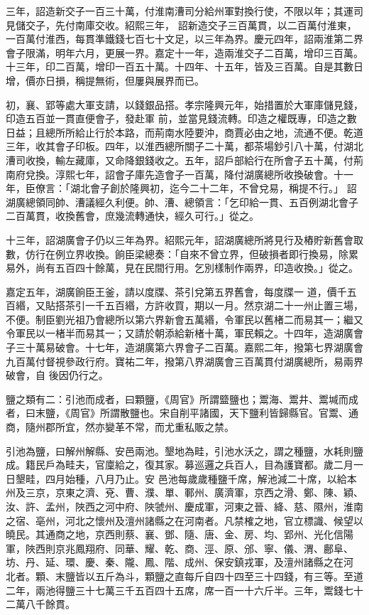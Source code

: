 \begin{pinyinscope}
 三年，詔造新交子一百三十萬，付淮南漕司分給州軍對換行使，不限以年；其運司見儲交子，先付南庫交收。紹熙三年，
 詔新造交子三百萬貫，以二百萬付淮東，一百萬付淮西，每貫準鐵錢七百七十文足，以三年為界。慶元四年，詔兩淮第二界會子限滿，明年六月，更展一界。嘉定十一年，造兩淮交子二百萬，增印三百萬。十三年，印二百萬，增印一百五十萬。十四年、十五年，皆及三百萬。自是其數日增，價亦日損，稱提無術，但屢與展界而已。



 初，襄、郢等處大軍支請，以錢銀品搭。孝宗隆興元年，始措置於大軍庫儲見錢，印造五百並一貫直便會子，發赴軍
 前，並當見錢流轉。印造之權既專，印造之數日益；且總所所給止行於本路，而荊南水陸要沖，商賈必由之地，流通不便。乾道三年，收其會子印板。四年，以淮西總所關子二十萬，都茶場鈔引八十萬，付湖北漕司收換，輸左藏庫，又命降銀錢收之。五年，詔戶部給行在所會子五十萬，付荊南府兌換。淳熙七年，詔會子庫先造會子一百萬，降付湖廣總所收換破會。十一年，臣僚言：「湖北會子創於隆興初，迄今二十二年，不曾兌易，稱提不行。」
 詔湖廣總領同帥、漕議經久利便。帥、漕、總領言：「乞印給一貫、五百例湖北會子二百萬貫，收換舊會，庶幾流轉通快，經久可行。」從之。



 十三年，詔湖廣會子仍以三年為界。紹熙元年，詔湖廣總所將見行及樁貯新舊會取數，仿行在例立界收換。餉臣梁總奏：「自來不曾立界，但破損者即行換易，除累易外，尚有五百四十餘萬，見在民間行用。乞別樣制作兩界，印造收換。」從之。



 嘉定五年，湖廣餉臣王釜，請以度牒、茶引兌第五界舊會，每度牒一
 道，價千五百緡，又貼搭茶引一千五百緡，方許收買，期以一月。然京湖二十一州止置三場，不便。制臣劉光祖乃會總所以第六界新會五萬緡，令軍民以舊楮二而易其一；繼又令軍民以一楮半而易其一；又請於朝添給新楮十萬，軍民賴之。十四年，造湖廣會子三十萬易破會。十七年，造湖廣第六界會子二百萬。嘉熙二年，撥第七界湖廣會九百萬付督視參政行府。寶祐二年，撥第八界湖廣會三百萬貫付湖廣總所，易兩界破會，自
 後因仍行之。



 鹽之類有二：引池而成者，曰顆鹽，《周官》所謂盬鹽也；鬻海、鬻井、鬻堿而成者，曰末鹽，《周官》所謂散鹽也。宋自削平諸國，天下鹽利皆歸縣官。官鬻、通商，隨州郡所宜，然亦變革不常，而尤重私販之禁。



 引池為鹽，曰解州解縣、安邑兩池。墾地為畦，引池水沃之，謂之種鹽，水耗則鹽成。籍民戶為畦夫，官廩給之，復其家。募巡邏之兵百人，目為護寶都。歲二月一日墾畦，四月始種，八月乃止。安
 邑池每歲歲種鹽千席，解池減二十席，以給本州及三京，京東之濟、兗、曹、濮、單、鄆州、廣濟軍，京西之滑、鄭、陳、穎、汝、許、孟州，陜西之河中府、陜虢州、慶成軍，河東之晉、絳、慈、隰州，淮南之宿、亳州，河北之懷州及澶州諸縣之在河南者。凡禁榷之地，官立標識、候望以曉民。其通商之地，京西則蔡、襄、鄧、隨、唐、金、房、均、郢州、光化信陽軍，陜西則京兆鳳翔府、同華、耀、乾、商、涇、原、邠、寧、儀、渭、鄜阜、坊、丹、延、環、慶、秦、隴、鳳、階、成州、保安鎮戎軍，及澶州諸縣之在河
 北者。顆、末鹽皆以五斤為斗，顆鹽之直每斤自四十四至三十四錢，有三等。至道二年，兩池得鹽三十七萬三千五百四十五席，席一百一十六斤半。三年，鬻錢七十二萬八千餘貫。




\end{pinyinscope}
